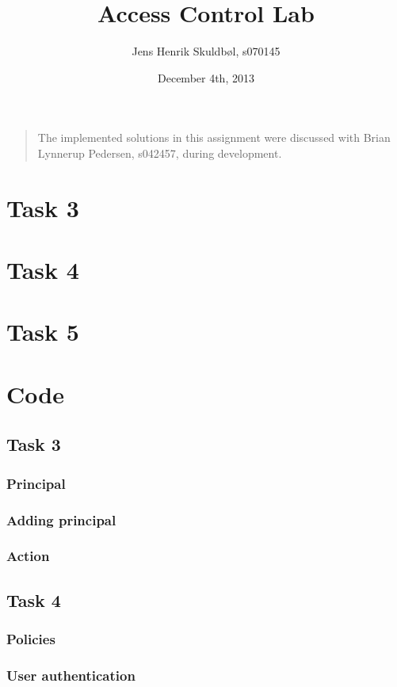 \documentclass{article}
\title{Access Control Lab}
\author{Jens Henrik Skuldbøl, s070145}
\date{December 4th, 2013}
\begin{document}
\maketitle
\thispagestyle{empty}

\begin{quote}
	The implemented solutions in this assignment were discussed
	with Brian Lynnerup Pedersen, s042457, during development.
\end{quote}

\newpage

\section{Task 3}

\section{Task 4}

\section{Task 5}

\newpage
\appendix

\section{Code}

\subsection{Task 3}

\subsubsection{Principal}

\subsubsection{Adding principal}

\subsubsection{Action}

\subsection{Task 4}

\subsubsection{Policies}

\subsubsection{User authentication}
\end{document}
